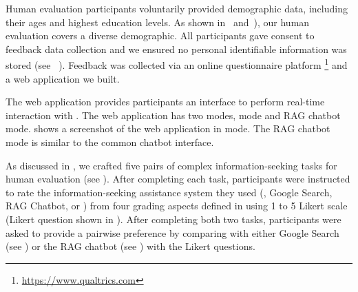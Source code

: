 \begin{table}
\centering
{}
    \caption{Pearson correlation between average human rubric grading scores and automatic rubric grading scores on discourse turn quality (n=50).}
    \label{tab:auto_grading_correlation}
\vspace{-1em}
\end{table}

Human evaluation participants voluntarily provided demographic data, including their ages and highest education levels. As shown in~ and~), our human evaluation covers a diverse demographic. All participants gave consent to feedback data collection and we ensured no personal identifiable information was stored (see ~). Feedback was collected via an online questionnaire platform \footnote{\url{https://www.qualtrics.com}} and a web application we built.

The web application provides participants an interface to perform real-time interaction with \system. The web application has two modes, \system mode and RAG chatbot mode.  shows a screenshot of the web application in \system mode. The RAG chatbot mode is similar to the common chatbot interface.

As discussed in , we crafted five pairs of complex information-seeking tasks for human evaluation (see ). After completing each task, participants were instructed to rate the information-seeking assistance system they used (\ie, Google Search, RAG Chatbot, or \system) from four grading aspects defined in  using 1 to 5 Likert scale (Likert question shown in ). After completing both two tasks, participants were asked to provide a pairwise preference by comparing \system with either Google Search (see ) or the RAG chatbot (see ) with the Likert questions.


